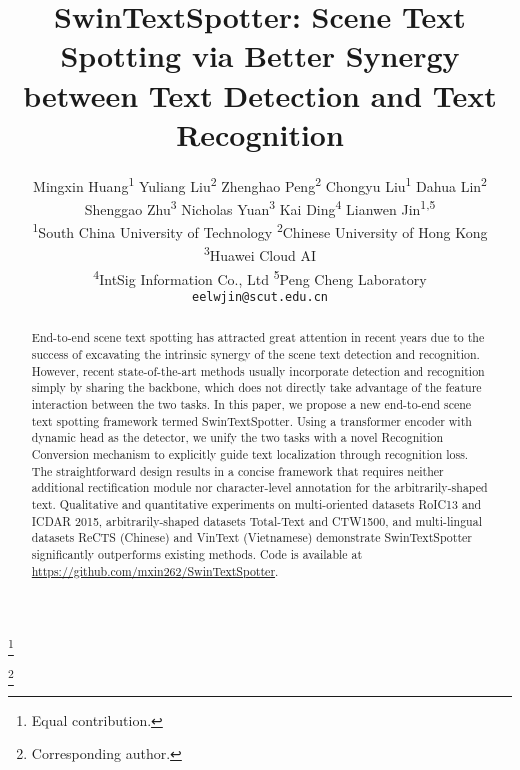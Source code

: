 \documentclass[10pt,twocolumn,letterpaper]{article}
\newcommand\blfootnote[1]{\begingroup
\renewcommand\thefootnote{}\footnote{#1}\addtocounter{footnote}{-1}\endgroup
}
\begin{document}
\title{
SwinTextSpotter: Scene Text Spotting via Better Synergy between Text Detection and Text Recognition
}

\author{
Mingxin Huang\textsuperscript{1}
\quad Yuliang Liu\textsuperscript{2}
\quad Zhenghao Peng\textsuperscript{2}
\quad Chongyu Liu\textsuperscript{1}
\quad Dahua Lin\textsuperscript{2} 
\\
\quad Shenggao Zhu\textsuperscript{3}
\quad Nicholas Yuan\textsuperscript{3}
\quad Kai Ding\textsuperscript{4}
\quad Lianwen Jin\textsuperscript{1,5}
\\
\textsuperscript{1}{South China University of Technology} 
\quad \textsuperscript{2}{Chinese University of Hong Kong}
\quad \textsuperscript{3}{Huawei Cloud AI}
\\
\quad \textsuperscript{4}{IntSig Information Co., Ltd}
\quad \textsuperscript{5}{Peng Cheng Laboratory}
\\
{\tt\small eelwjin@scut.edu.cn}
}

\maketitle

\begin{abstract}

End-to-end scene text spotting has attracted great attention in recent years due to the success of excavating the intrinsic synergy of the scene text detection and recognition. However, recent state-of-the-art methods usually incorporate detection and recognition simply by sharing the backbone, which does not directly take advantage of the feature interaction between the two tasks.
In this paper, we propose a new end-to-end scene text spotting framework termed SwinTextSpotter.
Using a transformer encoder with dynamic head as the detector, we unify the two tasks with a novel Recognition Conversion mechanism to explicitly guide text localization through recognition loss.
The straightforward design results in a concise framework that requires neither additional rectification module nor character-level annotation for the arbitrarily-shaped text. 
Qualitative and quantitative experiments on multi-oriented datasets RoIC13 and ICDAR 2015, arbitrarily-shaped datasets Total-Text and CTW1500, and multi-lingual datasets ReCTS (Chinese) and VinText (Vietnamese) demonstrate SwinTextSpotter significantly outperforms existing methods. Code is available at \url{https://github.com/mxin262/SwinTextSpotter}.

\end{abstract}
\blfootnote{Equal contribution.}
\blfootnote{Corresponding author.}
\end{document}
